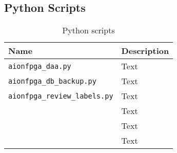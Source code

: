 \subsection{Python Scripts}
\label{subsec:python_scripts}


\begin{table}[hb]
  \caption{Python scripts}
  \label{tab:python_scripts}
  \centering
  \begin{tabular}{lp{8.5cm}}
    \toprule
    \textbf{Name} & \textbf{Description} \\
    \midrule
    \texttt{aionfpga\_daa.py} & Text \\
    \texttt{aionfpga\_db\_backup.py} & Text \\
    \texttt{aionfpga\_review\_labels.py} & Text \\
    \texttt{} & Text \\
    \texttt{} & Text \\
    \texttt{} & Text \\
    \bottomrule
  \end{tabular}
\end{table}

